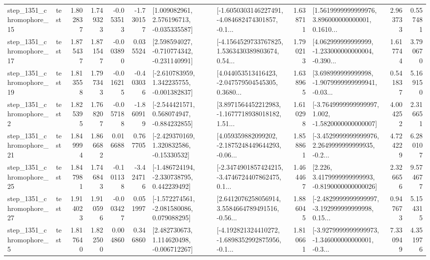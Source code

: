 \begin{tabular}{llrrrrllrlrr}
 step\_1351\_chromophore\_15 &      test &      1.802837 &    1.749323 &     -0.053513 & -1.730157 &    [1.009082961, 2.576196713, -0.035335587] &  [-1.6050303146227491, -4.084682474301857, -0.1... &       1.638711 &  [1.5619999999999976, 3.896000000000001, 0.1610... &            2.963733 &          0.557481 \\
 step\_1351\_chromophore\_17 &      test &      1.875437 &    1.871547 &     -0.003890 &  0.035524 &   [2.598594027, -0.710774342, -0.231140991] &  [-4.1564529733767825, 1.5363430389803674, 0.54... &       1.790213 &  [4.062999999999999, -1.233000000000004, -0.390... &            1.617744 &          3.790670 \\
 step\_1351\_chromophore\_19 &      test &      1.813558 &    1.797343 &     -0.016215 & -0.403036 &   [-2.610783959, 1.342235755, -0.001382837] &  [4.044053513416423, -2.047579504545305, 0.3680... &       1.638965 &  [3.698999999999998, -1.9079999999999941, -0.03... &            0.541837 &          5.169150 \\
  step\_1351\_chromophore\_2 &      test &      1.825395 &    1.768207 &     -0.057188 & -1.860919 &   [-2.544421571, 0.568074947, -0.884232855] &  [3.8971564452212983, -1.1677718938018182, 1.51... &       1.610298 &  [-3.7649999999999997, 1.002, -1.5820000000000007] &            4.004252 &          2.316651 \\
 step\_1351\_chromophore\_21 &      test &      1.849994 &    1.866682 &      0.016688 &  0.767705 &    [-2.429370169, 1.320832586, -0.15330532] &  [4.059359882099202, -2.1875248449644293, -0.06... &       1.858861 &  [-3.4529999999999976, 2.2649999999999935, -0.2... &            4.724229 &          6.280107 \\
 step\_1351\_chromophore\_25 &      test &      1.847981 &    1.746843 &     -0.101138 & -3.424716 &   [-1.486724194, -2.330738795, 0.442239492] &  [-2.3474901857424215, -3.4746724407862475, 0.1... &       1.464467 &   [2.226, 3.4179999999999993, -0.8190000000000026] &            2.326656 &          9.574677 \\
 step\_1351\_chromophore\_27 &      test &      1.914023 &    1.910596 &     -0.003427 &  0.051997 &   [-1.572274561, -2.081580086, 0.079088295] &  [2.6412076258056914, 3.5584664789491516, -0.56... &       1.886045 &  [-2.4829999999999997, -3.192999999999998, 0.15... &            0.947673 &          5.154315 \\
  step\_1351\_chromophore\_5 &      test &      1.817640 &    1.822500 &      0.004860 &  0.346860 &    [2.482730673, 1.114620498, -0.006712267] &  [-4.192821324410272, -1.6898352992875956, -0.1... &       1.810661 &  [-3.9279999999999973, -1.346000000000001, -0.3... &            7.330949 &          4.351976 \\

\end{tabular}
